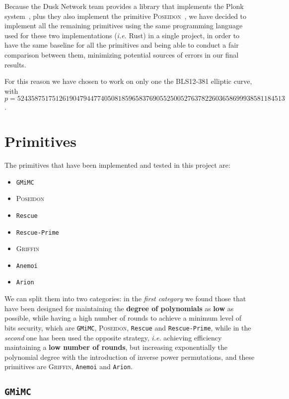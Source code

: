 \documentclass[12pt, a4paper]{report}
\begin{document}
Because the Dusk Network team provides a library that implements the \textsf{Plonk} system~\cite{dusk-plonk}, plus they also implement the primitive \textsc{Poseidon}~\cite{dusk-poseidon}, we have decided to implement all the remaining primitives using the same programming language used for these two implementations (\textsl{i.e.} Rust) in a single project, in order to have the same baseline for all the primitives and being able to conduct a fair comparison between them, minimizing potential sources of errors in our final results.

For this reason we have chosen to work on only one the BLS12-381 elliptic curve, with\\ $p = 52435875175126190479447740508185965837690552500527637822603658699938581184513$.

\section{Primitives}\label{sec:primitives}

The primitives that have been implemented and tested in this project are:
\begin{itemize}
  \item \texttt{GMiMC}~\cite{gmimc}
  \item \textsc{Poseidon}~\cite{poseidon}
  \item \texttt{Rescue}~\cite{rescue}
  \item \texttt{Rescue-Prime}~\cite{rescue-prime}
  \item \textsc{Griffin}~\cite{griffin}
  \item \texttt{Anemoi}~\cite{anemoi}
  \item \texttt{Arion}~\cite{arion}
\end{itemize}

We can split them into two categories: in the \textit{first category} we found those that have been designed for maintaining the \textbf{degree of polynomials} as \textbf{low} as possible, while having a high number of rounds to achieve a minimum level of bits security, which are \texttt{GMiMC}, \textsc{Poseidon}, \texttt{Rescue} and \texttt{Rescue-Prime}, while in the \textit{second} one has been used the opposite strategy, \textsl{i.e.} achieving efficiency maintaining a \textbf{low number of rounds}, but increasing exponentially the polynomial degree with the introduction of inverse power permutations, and these primitives are \textsc{Griffin}, \texttt{Anemoi} and \texttt{Arion}.

\subsection{\texttt{GMiMC}}\label{subsec:gmimc}
\end{document}
